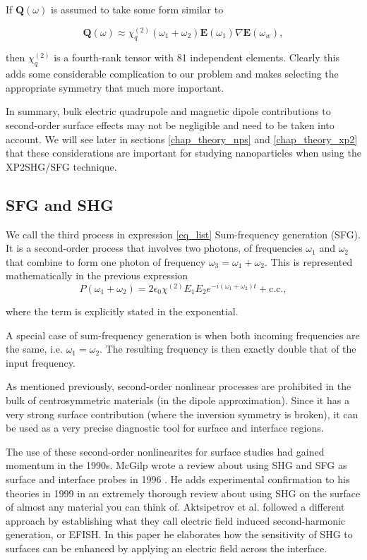 \documentclass[10pt]{article}
\begin{document}
If $\mathbf{Q}(\omega)$ is assumed to take some form similar to

\begin{equation}
\mathbf{Q}(\omega) \approx \chi^{(2)}_{q}(\omega_{1} + \omega_{2})\mathbf{E}(\omega_{1})\nabla\mathbf{E}(\omega_{w}),
\end{equation}

then $\chi^{(2)}_{q}$ is a fourth-rank tensor with 81 independent elements. Clearly this adds some considerable complication to our problem and makes selecting the appropriate symmetry that much more important.

In summary, bulk electric quadrupole and magnetic dipole contributions to second-order surface effects may not be negligible and need to be taken into account. We will see later in sections \ref{chap_theory_nps} and \ref{chap_theory_xp2} that these considerations are important for studying nanoparticles when using the XP2SHG/SFG technique.

\subsection{SFG and SHG}\label{chap_theory_sum}
We call the third process in expression \eqref{eq_list} Sum-frequency generation (SFG). It is a second-order process that involves two photons, of frequencies $\omega_{1}$ and $\omega_{2}$ that combine to form one photon of frequency $\omega_{3} = \omega_{1} + \omega_{2}$. This is represented mathematically in the previous expression
\begin{equation}
P(\omega_{1}+\omega_{2}) = 2\epsilon_{0}\chi^{(2)}E_{1}E_{2}e^{-i(\omega_{1}+\omega_{2})t} + \text{c.c.},
\end{equation}

where the term is explicitly stated in the exponential. 

A special case of sum-frequency generation is when both incoming frequencies are the same, i.e. $\omega_{1} = \omega_{2}$. The resulting frequency is then exactly double that of the input frequency. 

As mentioned previously, second-order nonlinear processes are prohibited in the bulk of centrosymmetric materials (in the dipole approximation). Since it has a very strong surface contribution (where the inversion symmetry is broken), it can be used as a very precise diagnostic tool for surface and interface regions.

The use of these second-order nonlinearites for surface studies had gained momentum in the 1990s. McGilp wrote a review about using SHG and SFG as surface and interface probes in 1996 \cite{mcgilp1996review}. He adds experimental confirmation to his theories in 1999 \cite{mcgilp1999second} in an extremely thorough review about using SHG on the surface of almost any material you can think of. Aktsipetrov et al. \cite{aktsipetrov1997dc} followed a different approach by establishing what they call electric field induced second-harmonic generation, or EFISH. In this paper he elaborates how the sensitivity of SHG to surfaces can be enhanced by applying an electric field across the interface.
\end{document}
